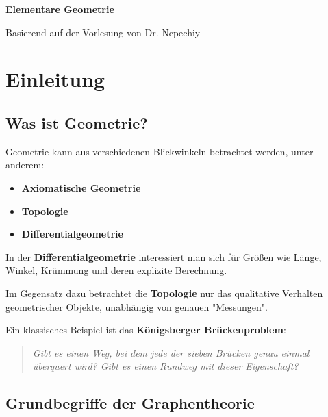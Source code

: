 \documentclass[a4paper,12pt]{article}
\theoremstyle{break}
\begin{document}
\begin{titlepage}
    \centering
    \vspace*{2cm}
    
    {\Huge\bfseries Elementare Geometrie \par}
    \vspace{1.5cm}
    
    {\Large Basierend auf der Vorlesung von Dr. Nepechiy \par}
    \vspace{2cm}
\end{titlepage}

\newpage
\tableofcontents
\newpage

\section{Einleitung}

\subsection{Was ist Geometrie?}
Geometrie kann aus verschiedenen Blickwinkeln betrachtet werden, unter anderem:

\begin{itemize}
    \item \textbf{Axiomatische Geometrie}
    \item \textbf{Topologie}
    \item \textbf{Differentialgeometrie}
\end{itemize}

In der \textbf{Differentialgeometrie} interessiert man sich für Größen wie Länge, Winkel, Krümmung und deren explizite Berechnung. 

Im Gegensatz dazu betrachtet die \textbf{Topologie} nur das qualitative Verhalten geometrischer Objekte, unabhängig von genauen "Messungen".

Ein klassisches Beispiel ist das \textbf{Königsberger Brückenproblem}:

\begin{quote}
    \textit{Gibt es einen Weg, bei dem jede der sieben Brücken genau einmal überquert wird? Gibt es einen Rundweg mit dieser Eigenschaft?}
\end{quote}

\subsection{Grundbegriffe der Graphentheorie}
\end{document}
